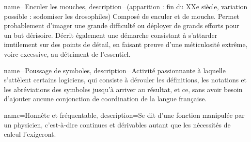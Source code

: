 {
	name=Enculer les mouches,
	description={(apparition : fin du XXe siècle, variation possible : sodomiser les drosophiles) Composé de enculer et de mouche. Permet probablement d'imager une grande difficulté ou déployer de grands efforts pour un but dérisoire. Décrit également une démarche consistant à s'attarder inutilement sur des points de détail, en faisant preuve d'une méticulosité extrême, voire excessive, au détriment de l'essentiel.}
}

{
	name=Poussage de symboles,
	description={Activité passionnante à laquelle s'attèlent certains logiciens, qui consiste à dérouler les définitions, les notations et les abréviations des symboles jusqu'à arriver au résultat, et ce, sans avoir besoin d'ajouter aucune conjonction de coordination de la langue française.}
}

{
	name=Honnête et fréquentable,
	description={Se dit d'une fonction manipulée par un physicien, c'est-à-dire continues et dérivables autant que les nécessités de calcul l'exigeront.}
}